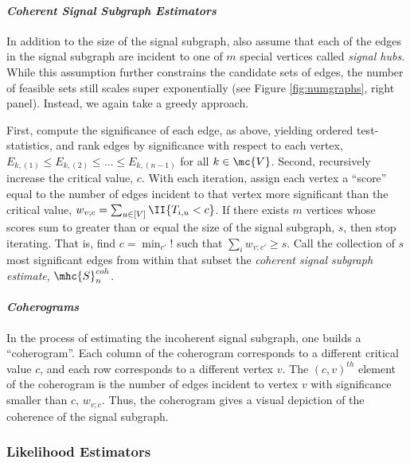 \documentclass[10pt,journal,cspaper,compsoc]{IEEEtran}
\begin{document}
\paragraph{\emph{Coherent Signal Subgraph Estimators}}

In addition to the size of the signal subgraph, also assume that each of the edges in the signal subgraph are incident to one of $m$ special vertices called \emph{signal hubs}. While this assumption further constrains the candidate sets of edges, the number of feasible sets still scales super exponentially (see Figure \ref{fig:numgraphs}, right panel).  Instead, we again take a greedy approach.  

First, compute the significance of each edge, as above, yielding ordered test-statistics, and rank edges by significance with respect to each vertex,  $E_{k,(1)} \leq E_{k,(2)} \leq \ldots \leq E_{k,(n-1)}$ for all $k \in \mc{V}$.  Second, recursively increase the critical value, $c$. With each iteration, assign each vertex a ``score'' equal to the number of edges incident to that vertex more significant than the critical value, $w_{v;c}=\sum_{u \in [V]} \II\{T_{i,u} < c\}$.  If there exists $m$ vertices whose scores sum to greater than or equal the size of the signal subgraph, $s$, then stop iterating.  That is, find $c=\min_{c'} !$ such that $\sum_{i} w_{v;c'}\geq s$.  Call the collection of $s$ most significant edges from within that subset the \emph{coherent signal subgraph estimate}, $\mhc{S}^{coh}_n$. %

\paragraph{\emph{Coherograms}}

In the process of estimating the incoherent signal subgraph, one builds a ``coherogram''.  Each column of the coherogram corresponds to a different critical value $c$, and each row corresponds to a different vertex $v$.  The $(c,v)^{th}$ element of the coherogram is the number of edges incident to vertex $v$ with significance smaller than $c$, $w_{v;c}$.  Thus, the coherogram gives a visual depiction of the coherence of the signal subgraph.


\subsubsection{Likelihood Estimators} %
\label{sub:likelihood}
\end{document}
